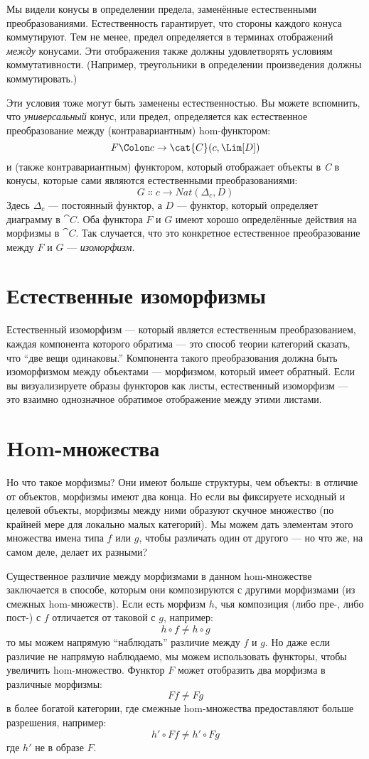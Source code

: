 Мы видели конусы в определении предела, заменённые естественными
преобразованиями. Естественность гарантирует, что стороны каждого конуса
коммутируют. Тем не менее, предел определяется в терминах отображений \emph{между}
конусами. Эти отображения также должны удовлетворять условиям коммутативности. (Например,
треугольники в определении произведения должны коммутировать.)

Эти условия тоже могут быть заменены естественностью. Вы можете вспомнить,
что \emph{универсальный} конус, или предел, определяется как естественное
преобразование между (контравариантным) hom-функтором:
\[F \Colon c \to \cat{C}(c, \Lim[D])\]
и (также контравариантным) функтором, который отображает объекты в \emph{C} в
конусы, которые сами являются естественными преобразованиями:
\[G \Colon c \to \mathit{Nat}(\Delta_c, D)\]
Здесь $\Delta_c$ --- постоянный функтор, а $D$ --- функтор,
который определяет диаграмму в $\cat{C}$. Оба функтора $F$ и
$G$ имеют хорошо определённые действия на морфизмы в $\cat{C}$. Так
случается, что это конкретное естественное преобразование между $F$
и $G$ --- \emph{изоморфизм}.

\section{Естественные изоморфизмы}

Естественный изоморфизм --- который является естественным преобразованием, каждая
компонента которого обратима --- это способ теории категорий сказать, что
``две вещи одинаковы.'' Компонента такого преобразования должна
быть изоморфизмом между объектами --- морфизмом, который имеет обратный.
Если вы визуализируете образы функторов как листы, естественный изоморфизм ---
это взаимно однозначное обратимое отображение между этими листами.

\section{Hom-множества}

Но что такое морфизмы? Они имеют больше структуры, чем объекты: в отличие от
объектов, морфизмы имеют два конца. Но если вы фиксируете исходный и
целевой объекты, морфизмы между ними образуют скучное множество (по
крайней мере для локально малых категорий). Мы можем дать элементам этого множества
имена типа $f$ или $g$, чтобы различать один от другого ---
но что же, на самом деле, делает их разными?

Существенное различие между морфизмами в данном hom-множестве заключается в
способе, которым они композируются с другими морфизмами (из смежных hom-множеств). Если
есть морфизм $h$, чья композиция (либо пре-, либо пост-)
с $f$ отличается от таковой с $g$, например:
\[h \circ f \neq h \circ g\]
то мы можем напрямую ``наблюдать'' различие между $f$ и
$g$. Но даже если различие не напрямую наблюдаемо, мы
можем использовать функторы, чтобы увеличить hom-множество. Функтор $F$ может
отобразить два морфизма в различные морфизмы:
\[F f \neq F g\]
в более богатой категории, где смежные hom-множества предоставляют больше
разрешения, например:
\[h' \circ F f \neq h' \circ F g\]
где $h'$ не в образе $F$.

